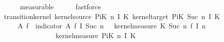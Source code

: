\begin{isabellebody}
\ \ \ \ \isamarkupfalse%
\ measurable\isanewline
\ \ \ \ \isamarkupfalse%
\ fastforce\isanewline
\ \ \isamarkupfalse%
\ \isamarkupfalse%
\ {\isachardoublequoteopen}transition{\isacharunderscore}{\kern0pt}kernel\ {\isacharparenleft}{\kern0pt}kernel{\isacharunderscore}{\kern0pt}source\ {\isacharparenleft}{\kern0pt}PiK\ n\ I\ K{\isacharparenright}{\kern0pt}{\isacharparenright}{\kern0pt}\ {\isacharparenleft}{\kern0pt}kernel{\isacharunderscore}{\kern0pt}target\ {\isacharparenleft}{\kern0pt}PiK\ {\isacharparenleft}{\kern0pt}Suc\ n{\isacharparenright}{\kern0pt}\ I\ K{\isacharparenright}{\kern0pt}{\isacharparenright}{\kern0pt}\isanewline
\ \ \ \ {\isacharparenleft}{\kern0pt}{\isasymlambda}{\isasymomega}\ A{\isacharprime}{\kern0pt}{\isachardot}{\kern0pt}\ {\isasymintegral}\isactrlsup {\isacharplus}{\kern0pt}{\isasymomega}\isactrlsub f{\isachardot}{\kern0pt}\ {\isacharparenleft}{\kern0pt}{\isasymintegral}\isactrlsup {\isacharplus}{\kern0pt}{\isasymomega}{\isachardot}{\kern0pt}\ indicator\ A{\isacharprime}{\kern0pt}\ {\isacharparenleft}{\kern0pt}{\isasymomega}\isactrlsub f\ {\isacharparenleft}{\kern0pt}I\ {\isacharparenleft}{\kern0pt}Suc\ n{\isacharparenright}{\kern0pt}\ {\isacharcolon}{\kern0pt}{\isacharequal}{\kern0pt}\ {\isasymomega}{\isacharparenright}{\kern0pt}{\isacharparenright}{\kern0pt}\ {\isasympartial}kernel{\isacharunderscore}{\kern0pt}measure\ {\isacharparenleft}{\kern0pt}{\isacharquery}{\kern0pt}K\ {\isacharparenleft}{\kern0pt}Suc\ n{\isacharparenright}{\kern0pt}{\isacharparenright}{\kern0pt}\ {\isacharparenleft}{\kern0pt}{\isasymomega}\isactrlsub f\ {\isacharparenleft}{\kern0pt}I\ n{\isacharparenright}{\kern0pt}{\isacharparenright}{\kern0pt}{\isacharparenright}{\kern0pt}\isanewline
\ \ \ \ \ \ \ \ \ \ \ \ \ \ \ \ {\isasympartial}kernel{\isacharunderscore}{\kern0pt}measure\ {\isacharparenleft}{\kern0pt}PiK\ n\ I\ K{\isacharparenright}{\kern0pt}\ {\isasymomega}{\isacharparenright}{\kern0pt}{\isachardoublequoteclose}\isanewline
\ \ \ \ \isamarkupfalse%

\end{isabellebody}
